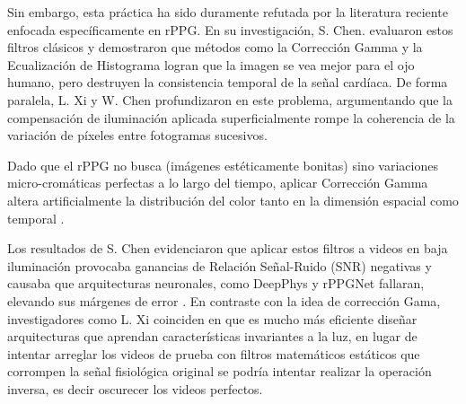 Sin embargo, esta práctica ha sido duramente refutada por la literatura reciente enfocada específicamente en rPPG. En su investigación, S. Chen. 
\cite{chen2024image_en} evaluaron estos filtros clásicos y demostraron que métodos como la Corrección Gamma y la Ecualización de Histograma logran que la imagen 
se vea mejor para el ojo humano, pero destruyen la consistencia temporal de la señal cardíaca. De forma paralela, L. Xi y W. Chen profundizaron en este problema, 
argumentando que la compensación de iluminación aplicada superficialmente rompe la coherencia de la variación de píxeles entre fotogramas sucesivos.

Dado que el rPPG no busca (imágenes estéticamente bonitas) sino variaciones micro-cromáticas perfectas a lo largo del tiempo, aplicar Corrección Gamma altera 
artificialmente la distribución del color tanto en la dimensión espacial como temporal \cite{yang2022assessment_dl}. 

Los resultados de S. Chen evidenciaron que aplicar estos filtros a videos 
en baja iluminación provocaba ganancias de Relación Señal-Ruido (SNR) negativas y causaba que arquitecturas neuronales, como DeepPhys y rPPGNet fallaran, elevando sus márgenes de error \cite{chen2024image_en}. 
En contraste con la idea de corrección Gama, investigadores como L. Xi coinciden en que es mucho más eficiente diseñar 
arquitecturas que aprendan características invariantes a la luz, en lugar de intentar arreglar los videos de prueba con filtros matemáticos estáticos que 
corrompen la señal fisiológica original se podría intentar realizar la operación inversa, es decir oscurecer los videos perfectos.



